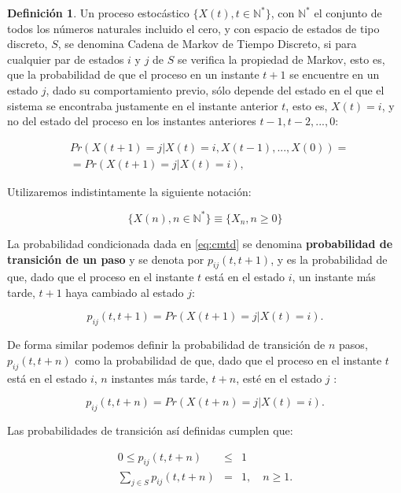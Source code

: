 \documentclass[
]{book}
\newenvironment{yellowbox}{
  \definecolor{shadecolor}{rgb}{210, 180, 140}  
  \color{black}
  \begin{shaded}}
 {\end{shaded}}
\theoremstyle{definition}
\newtheorem{definition}{Definición}[chapter]
\theoremstyle{definition}
\theoremstyle{definition}
\theoremstyle{definition}
\theoremstyle{remark}
\begin{document}
\begin{yellowbox}

\begin{definition}
\protect\hypertarget{def:CMTC}{}\label{def:CMTC}Un proceso estocástico \(\{X(t), t \in \mathbb{N}^*\}\), con \(\mathbb{N}^*\) el conjunto de todos los números naturales incluido el cero, y con espacio de estados de tipo discreto, \(S\), se denomina Cadena de Markov de Tiempo Discreto, si para cualquier par de estados \(i\) y \(j\) de \(S\) se verifica la propiedad de Markov, esto es, que la probabilidad de que el proceso en un instante \(t+1\) se encuentre en un estado \(j\), dado su comportamiento previo, sólo depende del estado en el que el sistema se encontraba justamente en el instante anterior \(t\), esto es, \(X(t)=i\), y no del estado del proceso en los instantes anteriores \(t-1, t-2,...,0\):

\begin{eqnarray}
&Pr(X(t+1) = j | X(t) = i, X(t-1),...,X(0)) = \nonumber \\
&= Pr(X(t+1) = j | X(t) = i),
\label{eq:cmtd}
\end{eqnarray}

Utilizaremos indistintamente la siguiente notación:

\[\{X(n), n \in \mathbb{N}^*\}\equiv \{X_n,  n \geq 0\}\]
\end{definition}

\end{yellowbox}

La probabilidad condicionada dada en \eqref{eq:cmtd} se denomina \textbf{probabilidad de transición de un paso} y se denota por \(p_{ij}(t,t+1)\), y es la probabilidad de que, dado que el proceso en el instante \(t\) está en el estado \(i\), un instante más tarde, \(t+1\) haya cambiado al estado \(j\):

\[p_{ij}(t,t+1)=Pr(X(t+1) = j | X(t) = i).\]

De forma similar podemos definir la probabilidad de transición de \(n\) pasos, \(p_{ij}(t,t+n)\) como la probabilidad de que, dado que el proceso en el instante \(t\) está en el estado \(i\), \(n\) instantes más tarde, \(t+n\), esté en el estado \(j\) :

\begin{equation}
p_{ij}(t,t+n)=Pr(X(t+n) = j | X(t) = i).
\label{eq:probtrans}
\end{equation}

Las probabilidades de transición así definidas cumplen que:

\begin{eqnarray*}
0 \leq p_{ij}(t,t+n) &\leq & 1 \\
\sum_{j \in S} p_{ij}(t,t+n) &=& 1, \quad n\geq 1.
\end{eqnarray*}
\end{document}

